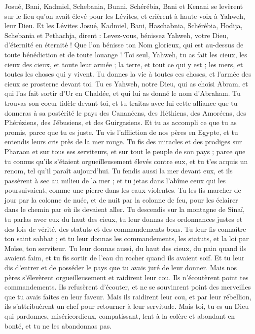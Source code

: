 \begin{multicols}{2}
Josué, Bani, Kadmiel, Schebania, Bunni, Schérébia, Bani et Kenani se levèrent sur le lieu qu'on avait élevé pour les Lévites, et crièrent à haute voix à Yahweh, leur Dieu.
Et les Lévites Josué, Kadmiel, Bani, Haschabnia, Schérébia, Hodija, Schebania et Pethachja, dirent : Levez-vous, bénissez Yahweh, votre Dieu, d'éternité en éternité ! Que l’on bénisse ton Nom glorieux, qui est au-dessus de toute bénédiction et de toute louange !
Toi seul, Yahweh, tu as fait les cieux, les cieux des cieux, et toute leur armée ; la terre, et tout ce qui y est ; les mers, et toutes les choses qui y vivent. Tu donnes la vie à toutes ces choses, et l'armée des cieux se prosterne devant toi.
Tu es Yahweh, notre Dieu, qui as choisi Abram, et qui l’as fait sortir d'Ur en Chaldée, et qui lui as donné le nom d'Abraham.
Tu trouvas son coeur fidèle devant toi, et tu traitas avec lui cette alliance que tu donneras à sa postérité le pays des Cananéens, des Héthiens, des Amoréens, des Phéréziens, des Jébusiens, et des Guirgasiens. Et tu as accompli ce que tu as promis, parce que tu es juste.
Tu vis l'affliction de nos pères en Egypte, et tu entendis leurs cris près de la mer rouge.
Tu fis des miracles et des prodiges sur Pharaon et sur tous ses serviteurs, et sur tout le peuple de son pays ; parce que tu connus qu'ils s'étaient orgueilleusement élevés contre eux, et tu t'es acquis un renom, tel qu'il paraît aujourd'hui.
Tu fendis aussi la mer devant eux, et ils passèrent à sec au milieu de la mer ; et tu jetas dans l’abîme ceux qui les poursuivaient, comme une pierre dans les eaux violentes.
Tu les fis marcher de jour par la colonne de nuée, et de nuit par la colonne de feu, pour les éclairer dans le chemin par où ils devaient aller.
Tu descendis sur la montagne de Sinaï, tu parlas avec eux du haut des cieux, tu leur donnas des ordonnances justes et des lois de vérité, des statuts et des commandements bons.
Tu leur fis connaître ton saint sabbat ; et tu leur donnas les commandements, les statuts, et la loi par Moïse, ton serviteur.
Tu leur donnas aussi, du haut des cieux, du pain quand ils avaient faim, et tu fis sortir de l'eau du rocher quand ils avaient soif. Et tu leur dis d’entrer et de posséder le pays que tu avais juré de leur donner.
Mais nos pères s’élevèrent orgueilleusement et raidirent leur cou. Ils n’écoutèrent point tes commandements.
Ils refusèrent d'écouter, et ne se souvinrent point des merveilles que tu avais faites en leur faveur. Mais ils raidirent leur cou, et par leur rébellion, ils s'attribuèrent un chef pour retourner à leur servitude. Mais toi, tu es un Dieu qui  pardonnes, miséricordieux, compatissant, lent à la colère et abondant en bonté, et tu ne les abandonnas pas.

\end{multicols}
